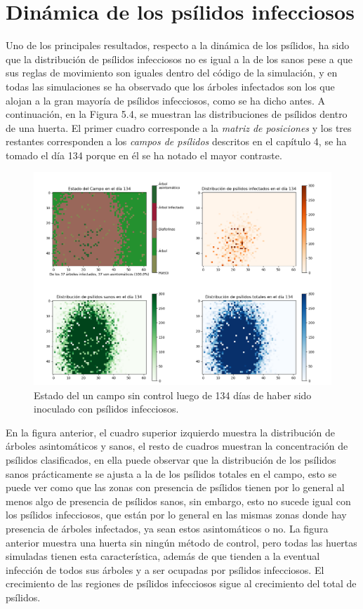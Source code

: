 \section{Dinámica de los psílidos infecciosos}
Uno de los principales resultados, respecto a la dinámica de los psílidos, ha sido que la distribución de psílidos infecciosos no es igual a la de los sanos pese a que sus reglas de movimiento son iguales dentro del código de la simulación, y en todas las simulaciones se ha observado que los árboles infectados son los que alojan a la gran mayoría de psílidos infecciosos, como se ha dicho antes. A continuación, en la Figura 5.4, se muestran las distribuciones de psílidos dentro de una huerta. El primer cuadro corresponde a la \textit{matriz de posiciones} y los tres restantes corresponden a los \textit{campos de psílidos} descritos en el capítulo 4, se ha tomado el día 134 porque en él se ha notado el mayor contraste.
\begin{figure}[H]
\centering
\includegraphics[width=1.\textwidth,keepaspectratio=true]{images/Imágenes C6/C6-3.png}
\caption{Estado del un campo sin control luego de 134 días de haber sido inoculado con psílidos infecciosos. }
\end{figure}
En la figura anterior, el cuadro superior izquierdo muestra la distribución de árboles asintomáticos y sanos, el resto de cuadros muestran la concentración de psílidos clasificados, en ella puede observar que la distribución de los psílidos sanos prácticamente se ajusta a la de los psílidos totales en el campo, esto se puede ver como que las zonas con presencia de psílidos tienen por lo general al menos algo de presencia de psílidos sanos, sin embargo, esto no sucede igual con los psílidos infecciosos, que están por lo general en las mismas zonas donde hay presencia de árboles infectados, ya sean estos asintomáticos o no.
La figura anterior muestra una huerta sin ningún método de control, pero todas las huertas simuladas tienen esta característica, además de que tienden a la eventual infección de todos sus árboles y a ser ocupadas por psílidos infecciosos. El crecimiento de las regiones de psílidos infecciosos sigue al crecimiento del total de psílidos.

